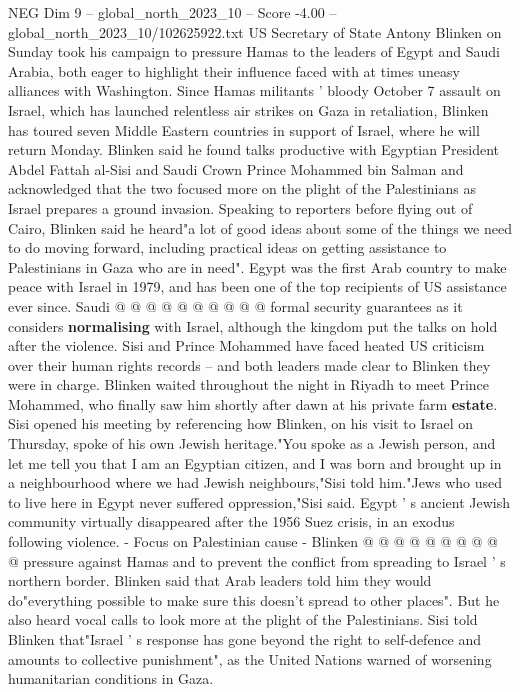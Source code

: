 \begin{textsample}{NEG Dim 9 – global\_north\_2023\_10 – Score -4.00 – global\_north\_2023\_10/102625922.txt}  \label{ex:f9_neg_146}
US Secretary of State Antony Blinken on Sunday took his campaign to pressure Hamas to the leaders of Egypt and Saudi Arabia, both eager to highlight their influence faced with at times uneasy alliances with Washington.
Since Hamas militants ' bloody October 7 assault on Israel, which has launched relentless air strikes on Gaza in retaliation, Blinken has toured seven Middle Eastern countries in support of Israel, where he will return Monday.
Blinken said he found talks productive with Egyptian President Abdel Fattah al-Sisi and Saudi Crown Prince Mohammed bin Salman and acknowledged that the two focused more on the plight of the Palestinians as Israel prepares a ground invasion.
Speaking to reporters before flying out of Cairo, Blinken said he heard"a lot of good ideas about some of the things we need to do moving forward, including practical ideas on getting assistance to Palestinians in Gaza who are in need".
Egypt was the first Arab country to make peace with Israel in 1979, and has been one of the top recipients of US assistance ever since.
Saudi @ @ @ @ @ @ @ @ @ @ formal security guarantees as it considers \textbf{normalising} with Israel, although the kingdom put the talks on hold after the violence.
Sisi and Prince Mohammed have faced heated US criticism over their human rights records -- and both leaders made clear to Blinken they were in charge.
Blinken waited throughout the night in Riyadh to meet Prince Mohammed, who finally saw him shortly after dawn at his private farm \textbf{estate}.
Sisi opened his meeting by referencing how Blinken, on his visit to Israel on Thursday, spoke of his own Jewish heritage."You spoke as a Jewish person, and let me tell you that I am an Egyptian citizen, and I was born and brought up in a neighbourhood where we had Jewish neighbours,"Sisi told him."Jews who used to live here in Egypt never suffered oppression,"Sisi said.
Egypt ' s ancient Jewish community virtually disappeared after the 1956 Suez crisis, in an exodus following violence. - Focus on Palestinian cause - Blinken @ @ @ @ @ @ @ @ @ @ pressure against Hamas and to prevent the conflict from spreading to Israel ' s northern border.
Blinken said that Arab leaders told him they would do"everything possible to make sure this doesn't spread to other places".
But he also heard vocal calls to look more at the plight of the Palestinians.
Sisi told Blinken that"Israel ' s response has gone beyond the right to self-defence and amounts to collective punishment", as the United Nations warned of worsening humanitarian conditions in Gaza.

\end{textsample}
